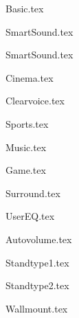 {Basic.tex}

{SmartSound.tex}

{SmartSound.tex}

{Cinema.tex}

{Clearvoice.tex}

{Sports.tex}

{Music.tex}

{Game.tex}

{Surround.tex}


{UserEQ.tex}

{Autovolume.tex}

{Standtype1.tex}

{Standtype2.tex}

{Wallmount.tex}

